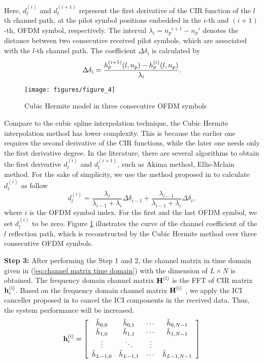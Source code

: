 \documentclass[AMA]{WileyNJD-v1}
\begin{document}
{{Here, $d^{(i)}_{l}$ and $d^{(i+1)}_{l}$ represent the first derivative of the CIR function of the $l$th channel path,  at the pilot symbol positions embedded in the  $i$-th and $(i+1)$-th, OFDM symbol, respectively. The interval ${\lambda_{i}} = {n_p}^{i+1}-{n_p}^{i} $ denotes the distance between two consecutive received pilot symbols, which are associated with the  $l$-th channel path. The coefficient ${\Delta {\delta _i}}$ is calculated by
%
\begin{equation*}
	\centering
	\Delta {\delta _i} =\frac{h^{(i+1)}_{p}(l,n_p) - h^{(i)}_{p}(l,n_p)}{\lambda_{i}}.
\end{equation*}
%
\begin{figure}
		\centering
		\texttt{[image: figures/figure\_4]}
		\caption{Cubic Hermite model in three consecutive OFDM symbols}
		\label{fig:derivativecubichermite}
\end{figure}	
%			
Compare to the cubic spline interpolation technique, the Cubic Hermite interpolation method has lower complexity. This is because the earlier one requires the second derivative of the CIR functions, while the later one needs only the first derivative degree. 
In the literature, there are several algorithms to obtain the first derivative $d^{(i)}_{l}$ and $d^{(i+1)}_{l}$, such as  Akima method, Ellis-Mclain method. For the sake of simplicity, we use the method proposed in \cite{ Fritsch1980} to calculate $d^{(i)}_{l}$ as follow
%
\begin{equation}
d^{(i)}_{l} = \dfrac{\lambda_{i}}{\lambda_{i-1}+\lambda_{i}}{\Delta {\delta _{i-1}}} + \dfrac{\lambda_{i-1}}{\lambda_{i-1}+\lambda_{i}}{\Delta {\delta _i}}, 	
\end{equation}
where $i$ is the  OFDM symbol index. For the first and the last OFDM symbol, we set $d^{(i)}_{l}$ to be zero. Figure \ref{fig:derivativecubichermite} illustrates the curve of the  channel coefficient of the $l$ reflection path, which is reconstructed by the Cubic Hermite method over three consecutive OFDM symbols.

			
\rm{\textbf {Step 3:} After performing the Step 1 and 2, the channel matrix in time domain given in (\ref{eq:channel matrix time domain}) with the dimension of $L \times N$ is obtained. The frequency domain channel matrix $\rm{\textbf H^{(i)}}$ is the FFT of CIR matrix  $\rm{\textbf h^{(i)}_{c}}$. Based on the frequency domain channel matrix $\rm{\textbf H^{(i)}}$ , we apply the ICI canceller proposed in \cite{Qiu2010} to cancel the ICI components in the received data. Thus, the system performance will be increased.
%
\begin{equation}\label{eq:channel matrix time domain}
	{
		\rm{\textbf h^{(i)}_{c}}=\left[\begin{array}{cccc}
		{\tilde{h}_{0,0}}& \tilde{h}_{0,1} &  \cdots &  \tilde{h}_{0,N-1} \\
		\tilde{h}_{1,0}&  \tilde{h}_{1,1}&  \cdots &  \tilde{h}_{1,N-1} \\
			\vdots &  \ddots&  \vdots \\
		\tilde{h}_{L-1,0}&  \tilde{h}_{L-1,1}&  \cdots &  \tilde{h}_{L-1,N-1}
		\end{array}\right]}
\end{equation}
%
				
}}}
\end{document}
